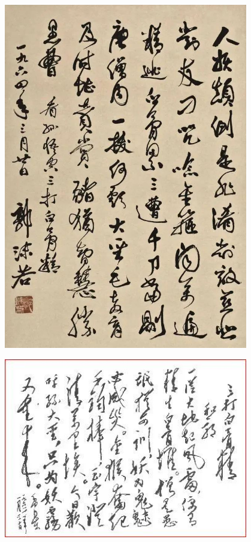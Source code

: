 \documentclass[12pt,UTF8]{ctexart}
\begin{document}
\begin{center}\includegraphics[width=0.8\textwidth,keepaspectratio]{chapter_2551633_专题五_社会主义建设道路初步探索的理论成果/unit_6273526_练习题二/question_16841953/title_img_1.png}\end{center}

\begin{center}\includegraphics[width=0.8\textwidth,keepaspectratio]{chapter_2551633_专题五_社会主义建设道路初步探索的理论成果/unit_6273526_练习题二/question_16841953/title_img_2.png}\end{center}
\end{document}
